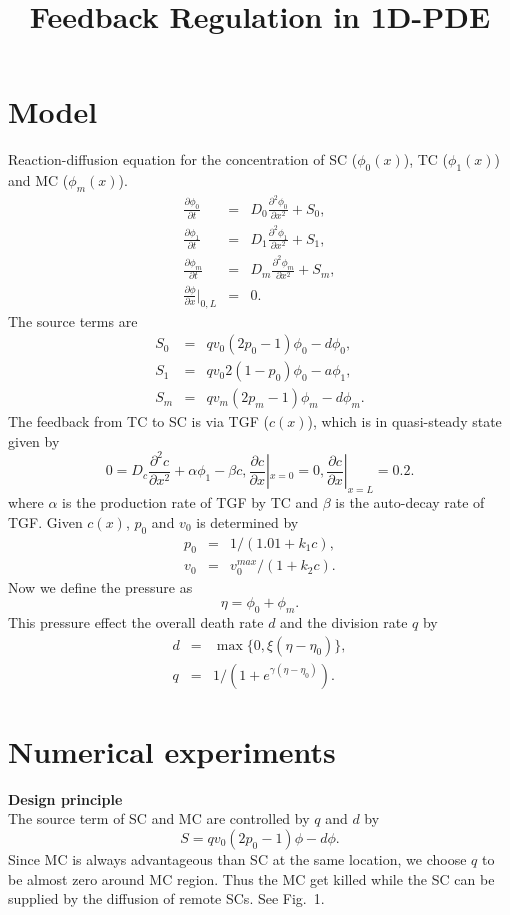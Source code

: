 \documentclass[12pt]{article}
\begin{document}
\title{Feedback Regulation in 1D-PDE}
\maketitle

\section{Model}

Reaction-diffusion equation for the concentration 
of SC ($\phi_0(x)$), TC ($\phi_1(x)$) and MC ($\phi_m(x)$).
\begin{eqnarray*}
\frac{\partial \phi_0}{\partial t} &=&
D_0 \frac{\partial^2 \phi_0}{\partial x^2} + S_0, \\
\frac{\partial \phi_1}{\partial t} &=&
D_1 \frac{\partial^2 \phi_1}{\partial x^2} + S_1, \\
\frac{\partial \phi_m}{\partial t} &=&
D_m \frac{\partial^2 \phi_m}{\partial x^2} + S_m, \\
\frac{\partial \phi}{\partial x}|_{0, L} &=& 0.
\end{eqnarray*}
The source terms are
\begin{eqnarray*}
S_0 &=& q v_0 (2p_0 - 1) \phi_0 - d \phi_0, \\
S_1 &=& q v_0 2(1 - p_0) \phi_0 - a \phi_1, \\
S_m &=& q v_m (2p_m - 1) \phi_m - d \phi_m.
\end{eqnarray*}
The feedback from TC to SC is via TGF ($c(x)$),
which is in quasi-steady state given by
$$
0 = D_c \frac{\partial^2 c}{\partial x^2} + 
\alpha \phi_1 - \beta c, \frac{\partial c}{\partial x}|_{x=0} = 0, 
\frac{\partial c}{\partial x}|_{x=L} = 0.2.
$$
where $\alpha$ is the production rate of TGF by TC and
$\beta$ is the auto-decay rate of TGF.
Given $c(x)$, $p_0$ and $v_0$ is determined by
\begin{eqnarray*}
p_0 &=& 1 / (1.01 + k_1 c), \\
v_0 &=& v_0^{max} / (1 + k_2 c).
\end{eqnarray*}
Now we define the pressure as
$$
\eta = \phi_0 + \phi_m.
$$
This pressure effect the overall death rate $d$ 
and the division rate $q$ by
\begin{eqnarray*}
d &=& \max \{0, \xi (\eta - \eta_0)\}, \\
q &=& 1 / (1 + e^{\gamma (\eta - \eta_0)} ).
\end{eqnarray*}

\section{Numerical experiments}
\noindent\textbf{Design principle}\\
The source term of SC and MC are controlled by $q$ and $d$ by
$$
S = q v_0 (2p_0 - 1) \phi - d \phi.
$$
Since MC is always advantageous than SC at the same location,
we choose $q$ to be almost zero around MC region.
Thus the MC get killed while the SC can be supplied by the 
diffusion of remote SCs. See Fig.~1.
\end{document}
